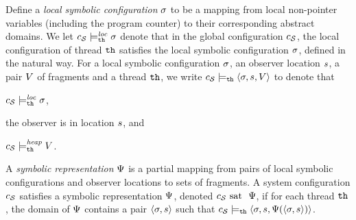 Define a {\em local symbolic configuration} $\sigma$ to be
a mapping from local non-pointer
variables (including the program counter) to their corresponding abstract
domains.
We let $c_{\mathcal S} \models_{{\tt th}}^{\mathit{loc}} \sigma$ denote that in the
global configuration $c_{\mathcal S}$, the
local configuration of thread ${\tt th}$ satisfies the local symbolic
configuration $\sigma$, defined in the natural way.
For a local symbolic configuration
$\sigma$, an observer location $s$, a pair
$V$ of fragments and a thread ${\tt th}$, we write
$c_{\mathcal S} \models_{{\tt th}}
\left\langle\sigma,s,V\right\rangle$ to denote that
\begin{inparaenum}[(i)]
\item $c_{\mathcal S} \models_{{\tt th}}^{\mathit{loc}} \sigma$,
\item the observer is in location $s$, and
\item  $c_{\mathcal S} \models_{{\tt th}}^{\mathit{heap}} V$.
\end{inparaenum}
\begin{definition}
  \label{def:symbrep}
    A {\em symbolic representation} $\Psi$ is a partial mapping from
pairs of local symbolic configurations and observer locations to
sets of fragments.
A system configuration $c_{\mathcal S}$ satisfies a symbolic representation $\Psi$,
denoted $c_{\mathcal S} \mbox{ sat \ } \Psi$,
if for each thread ${\tt th}$, 
the domain of $\Psi$ contains a pair
$\left\langle\sigma,s\right\rangle$ such that
$c_{\mathcal S} \models_{{\tt th}}
\left\langle\sigma,s,\Psi(\left\langle\sigma,s\right\rangle)\right\rangle$.
\end{definition}








